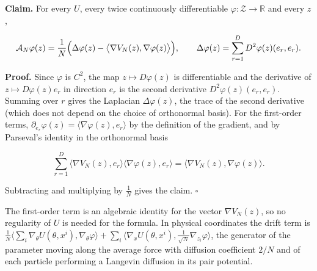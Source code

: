 \documentclass[11pt,a4paper]{article}
\begin{document}
\textbf{Claim.} For every \(U\), every twice continuously differentiable \(\varphi:\mathcal Z\to\mathbb R\) and every \(z\),


\[\mathcal A_N\varphi(z)=\frac1N\Bigl(\Delta\varphi(z)-\bigl\langle\nabla V_N(z),\nabla\varphi(z)\bigr\rangle\Bigr),\qquad\Delta\varphi(z)=\sum_{r=1}^DD^2\varphi(z)(e_r,e_r).\]


\textbf{Proof.} Since \(\varphi\) is \(C^2\), the map \(z\mapsto D\varphi(z)\) is differentiable and the derivative of \(z\mapsto D\varphi(z)e_r\) in direction \(e_r\) is the second derivative \(D^2\varphi(z)(e_r,e_r)\). Summing over \(r\) gives the Laplacian \(\Delta\varphi(z)\), the trace of the second derivative (which does not depend on the choice of orthonormal basis). For the first-order terms, \(\partial_{e_r}\varphi(z)=\langle\nabla\varphi(z),e_r\rangle\) by the definition of the gradient, and by Parseval's identity in the orthonormal basis


\[\sum_{r=1}^D\langle\nabla V_N(z),e_r\rangle\langle\nabla\varphi(z),e_r\rangle=\langle\nabla V_N(z),\nabla\varphi(z)\rangle .\]


Subtracting and multiplying by \(\frac1N\) gives the claim. \(\square\)




The first-order term is an algebraic identity for the vector \(\nabla V_N(z)\), so no regularity of \(U\) is needed for the formula. In physical coordinates the drift term is \(\frac1N\langle\sum_i\nabla_\theta U(\theta,x^i),\nabla_\theta\varphi\rangle+\sum_i\langle\nabla_xU(\theta,x^i),\frac1{\sqrt N}\nabla_{z_i}\varphi\rangle\), the generator of the parameter moving along the average force with diffusion coefficient \(2/N\) and of each particle performing a Langevin diffusion in its pair potential.
\end{document}
